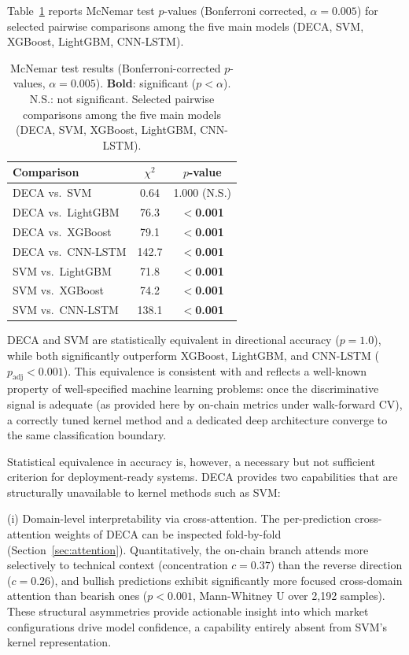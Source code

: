 \documentclass[final,3p,times,authoryear]{elsarticle}
\begin{document}
Table~\ref{tab:mcnemar} reports McNemar test $p$-values (Bonferroni
corrected, $\alpha = 0.005$) for selected pairwise comparisons among
the five main models (DECA, SVM, XGBoost, LightGBM, CNN-LSTM).

\begin{table}[ht]
\centering
\caption{McNemar test results (Bonferroni-corrected $p$-values,
  $\alpha = 0.005$). \textbf{Bold}: significant ($p < \alpha$).
  N.S.: not significant.
  Selected pairwise comparisons among the five main models
  (DECA, SVM, XGBoost, LightGBM, CNN-LSTM).}
\label{tab:mcnemar}
\small
\begin{tabular}{lcc}
\hline
Comparison & $\chi^2$ & $p$-value \\
\hline
DECA vs.\ SVM            & 0.64  & 1.000 (N.S.) \\
DECA vs.\ LightGBM       & 76.3  & \textbf{$<$0.001} \\
DECA vs.\ XGBoost        & 79.1  & \textbf{$<$0.001} \\
DECA vs.\ CNN-LSTM       & 142.7 & \textbf{$<$0.001} \\
SVM vs.\ LightGBM        & 71.8  & \textbf{$<$0.001} \\
SVM vs.\ XGBoost         & 74.2  & \textbf{$<$0.001} \\
SVM vs.\ CNN-LSTM        & 138.1 & \textbf{$<$0.001} \\
\hline
\end{tabular}
\end{table}

DECA and SVM are statistically equivalent in directional accuracy
($p = 1.0$), while both significantly outperform XGBoost, LightGBM,
and CNN-LSTM ($p_{\text{adj}} < 0.001$).
This equivalence is consistent with \citet{omole2025eaai} and reflects
a well-known property of well-specified machine learning problems: once
the discriminative signal is adequate (as provided here by on-chain
metrics under walk-forward CV), a correctly tuned kernel method and a
dedicated deep architecture converge to the same classification boundary.

Statistical equivalence in accuracy is, however, a necessary but not
sufficient criterion for deployment-ready systems.
DECA provides two capabilities that are structurally unavailable to
kernel methods such as SVM:

\noindent (i) Domain-level interpretability via cross-attention.
The per-prediction cross-attention weights of DECA can be inspected
fold-by-fold (Section~\ref{sec:attention}).
Quantitatively, the on-chain branch attends more selectively to
technical context (concentration $c=0.37$) than the reverse direction
($c=0.26$), and bullish predictions exhibit significantly more focused
cross-domain attention than bearish ones ($p < 0.001$, Mann-Whitney U
over 2{,}192 samples).
These structural asymmetries provide actionable insight into which
market configurations drive model confidence, a capability entirely
absent from SVM's kernel representation.
\end{document}
